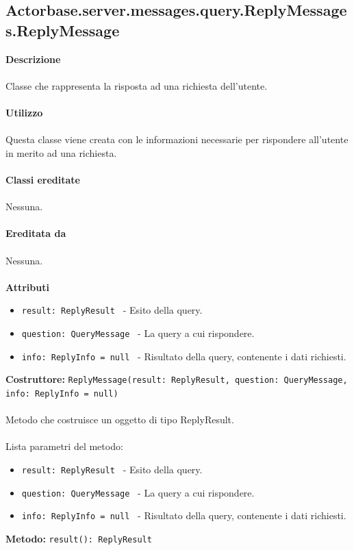 \documentclass[a4paper]{article}
\begin{document}
	\subsection{Actorbase.server.messages.query.ReplyMessages.ReplyMessage}
		\textbf{Descrizione}
			\\ \\
			Classe che rappresenta la risposta ad una richiesta dell'utente.
			\\ \\
		\textbf{Utilizzo}
			\\ \\
			Questa classe viene creata con le informazioni necessarie per rispondere all'utente in merito ad una richiesta.
			\\ \\
		\textbf{Classi ereditate}
			\\ \\
			Nessuna.
			\\ \\
		\textbf{Ereditata da}
			\\ \\
			Nessuna.
			\\ \\
		\textbf{Attributi}
			\begin{itemize}
				\item \texttt{result: ReplyResult } - Esito della query.
				\item \texttt{question: QueryMessage } - La query a cui rispondere.
				\item \texttt{info: ReplyInfo = null } - Risultato della query, contenente i dati richiesti.
			\end{itemize}
			\textbf{Costruttore: } \texttt{ReplyMessage(result: ReplyResult, question: QueryMessage, info: ReplyInfo = null)}
			\\ \\
			Metodo che costruisce un oggetto di tipo ReplyResult.
			\\ \\
			Lista parametri del metodo:
			\begin{itemize}
				\item \texttt{result: ReplyResult } - Esito della query.
				\item \texttt{question: QueryMessage } - La query a cui rispondere.
				\item \texttt{info: ReplyInfo = null } - Risultato della query, contenente i dati richiesti.
			\end{itemize}
			\textbf{Metodo: } \texttt{result(): ReplyResult }
\end{document}
